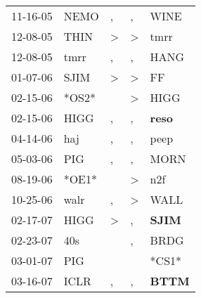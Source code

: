 \begin{supertabular}{p{0.07\textwidth}p{0.06\textwidth}p{0.02\textwidth}p{0.02\textwidth}p{0.06\textwidth}}
          11-16-05\textsuperscript{} &           NEMO\textsuperscript{} &                , &                , &           WINE\textsuperscript{} \\
          12-08-05\textsuperscript{} &           THIN\textsuperscript{} &     \textgreater &     \textgreater &           tmrr\textsuperscript{} \\
          12-08-05\textsuperscript{} &           tmrr\textsuperscript{} &                , &                , &           HANG\textsuperscript{} \\
          01-07-06\textsuperscript{} &           SJIM\textsuperscript{} &     \textgreater &     \textgreater &             FF\textsuperscript{} \\
          02-15-06\textsuperscript{} &                            *OS2* &                  &     \textgreater &           HIGG\textsuperscript{} \\
          02-15-06\textsuperscript{} &           HIGG\textsuperscript{} &                , &                , &  \textbf{reso\textsuperscript{}} \\
          04-14-06\textsuperscript{} &            haj\textsuperscript{} &                , &                , &           peep\textsuperscript{} \\
          05-03-06\textsuperscript{} &            PIG\textsuperscript{} &                , &                , &           MORN\textsuperscript{} \\
          08-19-06\textsuperscript{} &                            *OE1* &                  &     \textgreater &            n2f\textsuperscript{} \\
          10-25-06\textsuperscript{} &           walr\textsuperscript{} &                , &     \textgreater &           WALL\textsuperscript{} \\
          02-17-07\textsuperscript{} &           HIGG\textsuperscript{} &     \textgreater &                , &  \textbf{SJIM\textsuperscript{}} \\
          02-23-07\textsuperscript{} &            40s\textsuperscript{} &                  &                , &           BRDG\textsuperscript{} \\
          03-01-07\textsuperscript{} &            PIG\textsuperscript{} &                  &                  &                            *CS1* \\
          03-16-07\textsuperscript{} &           ICLR\textsuperscript{} &                , &                , &  \textbf{BTTM\textsuperscript{}} \\

\end{supertabular}
